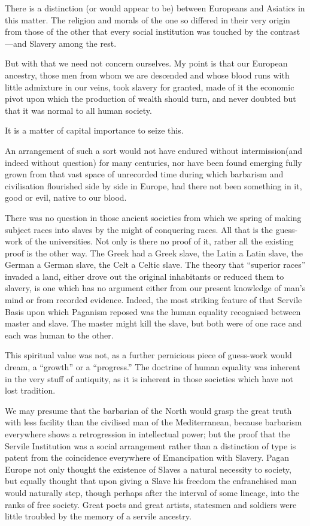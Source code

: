 \documentclass{book}
\begin{document}
There is a distinction (or would appear to be) between Europeans and Asiatics in this matter. The religion and morals of the one so differed in their very origin from those of the other that every social institution was touched by the contrast—and Slavery among the rest.

But with that we need not concern ourselves. My point is that our European ancestry, those men from whom we are descended and whose blood runs with little admixture in our veins, took slavery for granted, made of it the economic pivot upon which the production of wealth should turn, and never doubted but that it was normal to all human society.

It is a matter of capital importance to seize this.

An arrangement of such a sort would not have endured without intermission(and indeed without question) for many centuries, nor have been found emerging fully grown from that vast space of unrecorded time during which barbarism and civilisation flourished side by side in Europe, had there not been something in it, good or evil, native to our blood.

There was no question in those ancient societies from which we spring of making subject races into slaves by the might of conquering races. All that is the guess-work of the universities. Not only is there no proof of it, rather all the existing proof is the other way. The Greek had a Greek slave, the Latin a Latin slave, the German a German slave, the Celt a Celtic slave. The theory that “superior races” invaded a land, either drove out the original inhabitants or reduced them to slavery, is one which has no argument either from our present knowledge of man’s mind or from recorded evidence. Indeed, the most striking feature of that Servile Basis upon which Paganism reposed was the human equality recognised between master and slave. The master might kill the slave, but both were of one race and each was human to the other.

This spiritual value was not, as a further pernicious piece of guess-work would dream, a “growth” or a “progress.” The doctrine of human equality was inherent in the very stuff of antiquity, as it is inherent in those societies which have not lost tradition.

We may presume that the barbarian of the North would grasp the great truth with less facility than the civilised man of the Mediterranean, because barbarism everywhere shows a retrogression in intellectual power; but the proof that the Servile Institution was a social arrangement rather than a distinction of type is patent from the coincidence everywhere of Emancipation with Slavery. Pagan Europe not only thought the existence of Slaves a natural necessity to society, but equally thought that upon giving a Slave his freedom the enfranchised man would naturally step, though perhaps after the interval of some lineage, into the ranks of free society. Great poets and great artists, statesmen and soldiers were little troubled by the memory of a servile ancestry.
\end{document}
